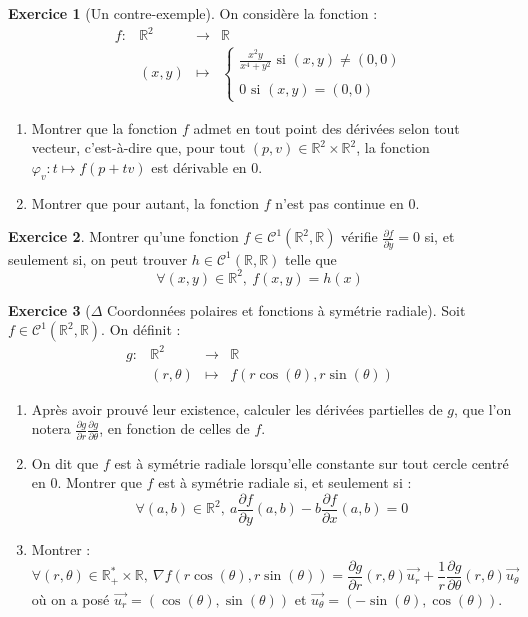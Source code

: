 \documentclass[french]{book}
\newcommand{\R}{\mathbb{R}}
\newcommand{\st}{^*}
\theoremstyle{definition}
\newtheorem{ex}{Exercice}[chapter]
\theoremstyle{theorem}
\theoremstyle{remark}
\begin{document}
\begin{ex}[Un contre-exemple]
	On considère la fonction : $$\begin{array}{lrcl}
		f:&\R^2&\longrightarrow&\R \\
		&(x,y)&\longmapsto&\begin{cases}
			\displaystyle\frac{x^2y}{x^4+y^2}\text{ si }(x,y)\ne(0,0) \\ \\
			0 \text{ si }(x,y)=(0,0)
		\end{cases}
	\end{array}$$
	\begin{enumerate}
		\item Montrer que la fonction $f$ admet en tout point des dérivées selon tout vecteur, c'est-à-dire que, pour tout $(p,v)\in\R^2\times\R^2$, la fonction $\varphi_v:t\mapsto f(p+tv)$ est dérivable en $0$.
		\item Montrer que pour autant, la fonction $f$ n'est pas continue en $0$.
	\end{enumerate}
\end{ex}

\begin{ex}
	Montrer qu'une fonction $f\in\mathcal{C}^1(\R^2,\R)$ vérifie $\displaystyle\frac{\partial f}{\partial y}=0$ si, et seulement si, on peut trouver $h\in\mathcal{C}^1(\R,\R)$ telle que $$\forall (x,y)\in\R^2,\ f(x,y)=h(x)$$
\end{ex}

\begin{ex}[$\Delta$ Coordonnées polaires et fonctions à symétrie radiale]
	Soit $f\in\mathcal{C}^1(\R^2,\R)$. On définit : $$\begin{array}{lrcl}
		g:&\R^2&\longrightarrow&\R \\
		&(r,\theta)&\longmapsto&f(r\cos(\theta),r\sin(\theta))
	\end{array}$$
	\begin{enumerate}
		\item Après avoir prouvé leur existence, calculer les dérivées partielles de $g$, que l'on notera $\displaystyle\frac{\partial g}{\partial r}$$\displaystyle\frac{\partial g}{\partial \theta}$, en fonction de celles de $f$.
		\item On dit que $f$ est à symétrie radiale lorsqu'elle constante sur tout cercle centré en $0$. Montrer que $f$ est à symétrie radiale si, et seulement si : $$	\forall (a,b)\in\R^2,\ a\frac{\partial f}{\partial y}(a,b)-b\frac{\partial f}{\partial x}(a,b)=0$$
		\item Montrer : $$\forall (r,\theta)\in\R_+\st\times\R,\ \nabla f(r\cos(\theta),r\sin(\theta))=\frac{\partial g}{\partial r}(r,\theta)\overrightarrow{u_r}+\frac{1}{r}\frac{\partial g}{\partial \theta}(r,\theta)\overrightarrow{u_\theta}$$ où on a posé $\overrightarrow{u_r}=(\cos(\theta),\sin(\theta))$ et $\overrightarrow{u_\theta}=(-\sin(\theta),\cos(\theta))$.
	\end{enumerate}
\end{ex}
\end{document}
